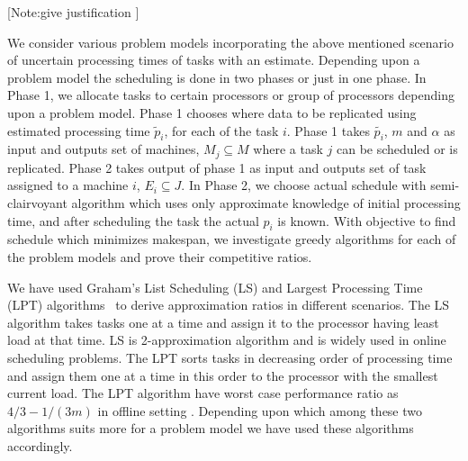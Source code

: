 \documentclass[10pt, conference, compsocconf]{IEEEtran}
\begin{document}
[Note:give justification ]


We consider various problem models  incorporating the above mentioned scenario of uncertain processing times of tasks with an estimate. Depending upon  a problem model the scheduling is done in two phases or just in one phase. In Phase 1, we allocate tasks to certain processors or group of processors depending upon a problem model.  Phase 1 chooses where data to be  replicated using estimated processing time $\tilde p_i $, for each of the task $i$. Phase 1 takes $\tilde{p_i}$, $m$ and $\alpha$ as input and outputs set of machines, $M_j \subseteq M $ where a task $j$ can be scheduled or is replicated. Phase 2 takes output of phase 1 as input and outputs set of task assigned to a machine $i$, $E_i \subseteq J$.   In Phase 2, we choose actual schedule with semi-clairvoyant algorithm which uses only approximate knowledge of initial processing time, and after scheduling the task the actual $p_i$ is known.  With  objective to find schedule which minimizes makespan, we investigate greedy algorithms for each of the problem models and prove their competitive ratios. 

We have used  Graham's List Scheduling (LS) and Largest Processing Time (LPT) algorithms~\cite{Graham69boundson} to derive approximation ratios in different scenarios. The LS algorithm takes tasks one at a time and assign  it to the processor having least load at that time. LS is 2-approximation algorithm and is widely used in online scheduling problems.  The LPT sorts tasks in decreasing order of processing time and assign them one at a time in this order to the processor with the smallest current load. The LPT algorithm have worst case performance ratio as $4/3-1/(3m) $ in offline setting
. Depending upon which among these two algorithms suits more for a problem model we have used these algorithms accordingly.
\end{document}
